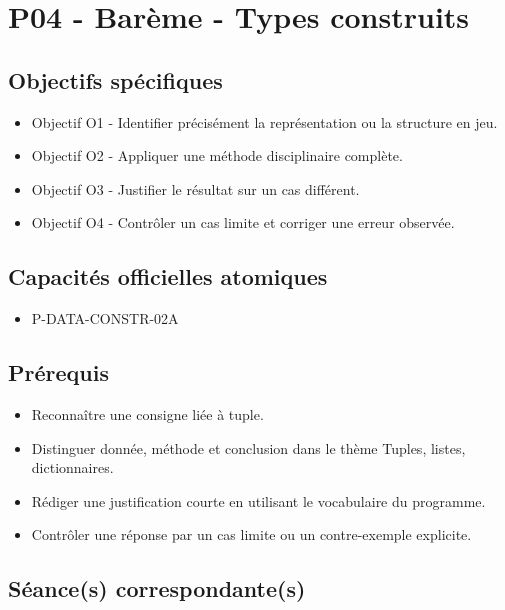 \section{P04 - Barème - Types construits}

\subsection{Objectifs spécifiques}

\begin{itemize}
\tightlist
\item
  Objectif O1 - Identifier précisément la représentation ou la structure
  en jeu.
\item
  Objectif O2 - Appliquer une méthode disciplinaire complète.
\item
  Objectif O3 - Justifier le résultat sur un cas différent.
\item
  Objectif O4 - Contrôler un cas limite et corriger une erreur observée.
\end{itemize}

\subsection{Capacités officielles atomiques}

\begin{itemize}
\tightlist
\item
  P-DATA-CONSTR-02A
\end{itemize}

\subsection{Prérequis}

\begin{itemize}
\tightlist
\item
  Reconnaître une consigne liée à tuple.
\item
  Distinguer donnée, méthode et conclusion dans le thème Tuples, listes,
  dictionnaires.
\item
  Rédiger une justification courte en utilisant le vocabulaire du
  programme.
\item
  Contrôler une réponse par un cas limite ou un contre-exemple
  explicite.
\end{itemize}

\subsection{Séance(s) correspondante(s)}

